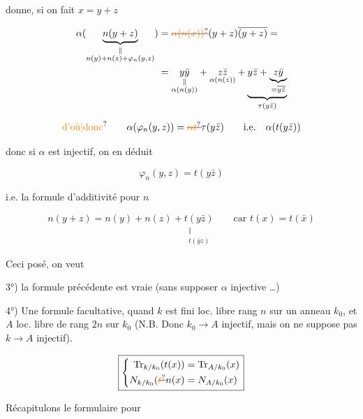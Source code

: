 donne, si on fait $x=y+z$

\[
\begin{aligned}
\alpha(\underset{\substack{\Vert\\ n(y)+n(z)+\varphi_n(y,z)}}{\underbrace{n(y+z)}})
&=\deleted{\unsure{\alpha(n(x))}}(y+z)\overline{(y+z)}=\\
&=\underset{\substack{\Vert\\\alpha(n(y))}}{y\bar y}
+\underset{\alpha(n(z))}{z\bar z}
+\underbrace{y\bar z+\underbrace{z\bar y}_{=\overline{y\bar z}}}_{\tau(y\bar z)}
\end{aligned}
\]

\[
\text{\unsure{d'où|donc}}\qquad\alpha(\varphi_n(y,z))=\deleted{\unsure{\alpha t}}\tau(y\bar z)
\qquad\text{i.e.}\quad\alpha(t(y\bar z))
\]

donc si $\alpha$ est injectif, on en déduit

\[
\boxed{\varphi_n(y,z)=t(y\bar z)}
\]

i.e. la formule d'additivité pour $n$

\[
\boxed{n(y+z)=n(y)+n(z)+\underset{\substack{\Vert\\t(\bar yz)}}{t(y\bar z)}}
\qquad\text{car }t(x)=t(\bar x)
\]

Ceci posé, on veut

3°) la formule précédente est vraie (sans supposer $\alpha$ injective \ldots)

4°) Une formule facultative, quand $k$ est fini loc. libre  rang  $n$ sur un anneau $k_0$, et  $A$ loc. libre de rang $2n$ sur $k_0$ (N.B. Donc $k_0\longrightarrow A$ injectif, mais on ne suppose pas $k\longrightarrow A$ injectif).

\[
\boxed{\left\{\begin{aligned}
\mathrm{Tr}_{k/k_0}(t(x))&=\mathrm{Tr}_{A/k_0}(x)\\
N_{k/k_0}(\deleted{\unsure{t}}n(x)&=N_{A/k_0}(x)
\end{aligned}\right.}
\]





Récapitulons le formulaire pour


